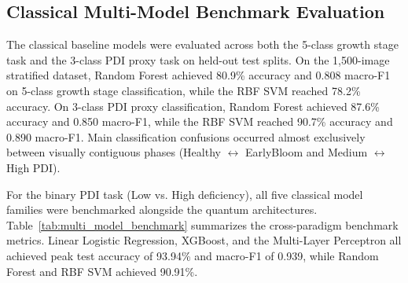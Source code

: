 \documentclass{ieeeaccess}
\begin{document}
\subsection{Classical Multi-Model Benchmark Evaluation}
The classical baseline models were evaluated across both the 5-class growth stage task and the 3-class PDI proxy task on held-out test splits. On the 1,500-image stratified dataset, Random Forest achieved 80.9\% accuracy and 0.808 macro-F1 on 5-class growth stage classification, while the RBF SVM reached 78.2\% accuracy. On 3-class PDI proxy classification, Random Forest achieved 87.6\% accuracy and 0.850 macro-F1, while the RBF SVM reached 90.7\% accuracy and 0.890 macro-F1. Main classification confusions occurred almost exclusively between visually contiguous phases (Healthy $\leftrightarrow$ EarlyBloom and Medium $\leftrightarrow$ High PDI).

For the binary PDI task (Low vs. High deficiency), all five classical model families were benchmarked alongside the quantum architectures. Table~\ref{tab:multi_model_benchmark} summarizes the cross-paradigm benchmark metrics. Linear Logistic Regression, XGBoost, and the Multi-Layer Perceptron all achieved peak test accuracy of 93.94\% and macro-F1 of 0.939, while Random Forest and RBF SVM achieved 90.91\%.
\end{document}

